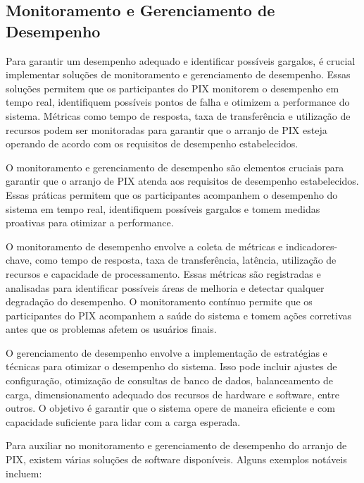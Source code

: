 \documentclass[12pt]{article}
\begin{document}
\subsection{Monitoramento e Gerenciamento de Desempenho} \label{sec:tecnologia}

Para garantir um desempenho adequado e identificar possíveis gargalos, é crucial implementar soluções de monitoramento e gerenciamento de desempenho. Essas soluções permitem que os participantes do PIX monitorem o desempenho em tempo real, identifiquem possíveis pontos de falha e otimizem a performance do sistema. Métricas como tempo de resposta, taxa de transferência e utilização de recursos podem ser monitoradas para garantir que o arranjo de PIX esteja operando de acordo com os requisitos de desempenho estabelecidos.

O monitoramento e gerenciamento de desempenho são elementos cruciais para garantir que o arranjo de PIX atenda aos requisitos de desempenho estabelecidos. Essas práticas permitem que os participantes acompanhem o desempenho do sistema em tempo real, identifiquem possíveis gargalos e tomem medidas proativas para otimizar a performance.

O monitoramento de desempenho envolve a coleta de métricas e indicadores-chave, como tempo de resposta, taxa de transferência, latência, utilização de recursos e capacidade de processamento. Essas métricas são registradas e analisadas para identificar possíveis áreas de melhoria e detectar qualquer degradação do desempenho. O monitoramento contínuo permite que os participantes do PIX acompanhem a saúde do sistema e tomem ações corretivas antes que os problemas afetem os usuários finais.

O gerenciamento de desempenho envolve a implementação de estratégias e técnicas para otimizar o desempenho do sistema. Isso pode incluir ajustes de configuração, otimização de consultas de banco de dados, balanceamento de carga, dimensionamento adequado dos recursos de hardware e software, entre outros. O objetivo é garantir que o sistema opere de maneira eficiente e com capacidade suficiente para lidar com a carga esperada.

Para auxiliar no monitoramento e gerenciamento de desempenho do arranjo de PIX, existem várias soluções de software disponíveis. Alguns exemplos notáveis incluem:
\end{document}
